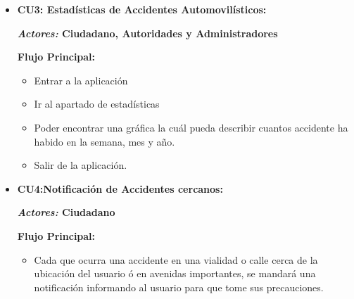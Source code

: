 \begin{itemize}[label=\textcolor{Lotus}{$\triangleright$}]
    \item {
        \textbf{\color{Purpura}CU3: Estadísticas de Accidentes Automovilísticos:}

        \textbf{\textit{Actores:} Ciudadano, Autoridades y Administradores}

        \textbf{Flujo Principal:}

        \begin{itemize}[label=\textcolor{Amarillo}{$\triangleright$}]
            \item Entrar a la aplicación
            \item Ir al apartado de estadísticas
            \item Poder encontrar una gráfica la cuál pueda describir cuantos accidente ha habido en la semana, mes y año.
            \item Salir de la aplicación.
        \end{itemize}
    }
        
    \item {
        \textbf{\color{Purpura}CU4:Notificación de Accidentes cercanos:}
        
        \textbf{\textit{Actores:} Ciudadano }

        \textbf{Flujo Principal:}

        \begin{itemize}[label=\textcolor{Amarillo}{$\triangleright$}]
            \item Cada que ocurra una accidente en una vialidad o calle cerca de la ubicación del usuario ó en avenidas importantes, se mandará una notificación informando al usuario para que tome sus precauciones.
        \end{itemize}
    }
\end{itemize}